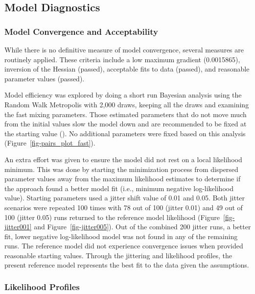 \documentclass[
]{scrartcl}
\begin{document}
\newpage{}

\subsection{Model Diagnostics}\label{model-diagnostics}

\subsubsection{Model Convergence and
Acceptability}\label{model-convergence}

While there is no definitive measure of model convergence, several
measures are routinely applied. These criteria include a low maximum
gradient (0.0015865), inversion of the Hessian (passed), acceptable fits
to data (passed), and reasonable parameter values (passed).

Model efficiency was explored by doing a short run Bayesian analysis
using the Random Walk Metropolis with 2,000 draws, keeping all the draws
and examining the fast mixing parameters. Those estimated parameters
that do not move much from the initial values slow the model down and
are recommended to be fixed at the starting value
(). No
additional parameters were fixed based on this analysis
(Figure~\ref{fig-pairs_plot_fast}).

An extra effort was given to ensure the model did not rest on a local
likelihood minimum. This was done by starting the minimization process
from dispersed parameter values away from the maximum likelihood
estimates to determine if the approach found a better model fit (i.e.,
minimum negative log-likelihood value). Starting parameters used a
jitter shift value of 0.01 and 0.05. Both jitter scenarios were repeated
100 times with 78 out of 100 (jitter 0.01) and 49 out of 100 (jitter
0.05) runs returned to the reference model likelihood
(Figure~\ref{fig-jitter001} and Figure~\ref{fig-jitter005}). Out of the
combined 200 jitter runs, a better fit, lower negative log-likelihood
model was not found in any of the remaining runs. The reference model
did not experience convergence issues when provided reasonable starting
values. Through the jittering and likelihood profiles, the present
reference model represents the best fit to the data given the
assumptions.

\subsubsection{Likelihood Profiles}\label{likelihood-profiles}
\end{document}
